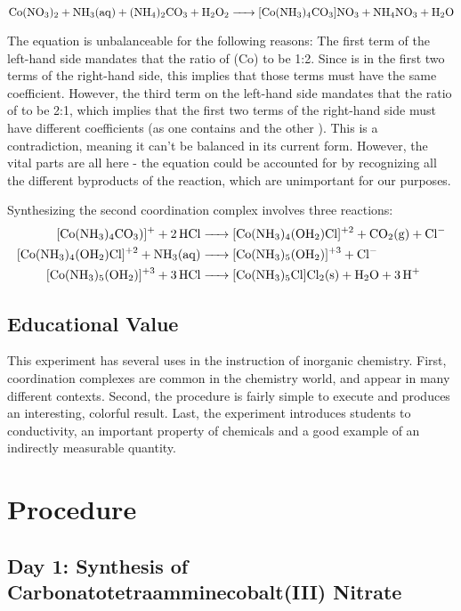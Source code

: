 \documentclass{article}
\begin{document}
\begin{equation}
\ce{Co(NO3)2 + NH3(aq) + (NH4)2CO3 + H2O2 -> [Co(NH3)4CO3]NO3 + NH4NO3 + H2O}
\end{equation}

The equation is unbalanceable for the following reasons: The first term of the left-hand side mandates that the ratio of \ce(Co) to  be 1:2. Since  is in the first two terms of the right-hand side, this implies that those terms must have the same coefficient. However, the third term on the left-hand side mandates that the ratio of  to  be 2:1, which implies that the first two terms of the right-hand side must have different coefficients (as one contains  and the other ). This is a contradiction, meaning it can't be balanced in its current form. However, the vital parts are all here - the equation could be accounted for by recognizing all the different byproducts of the reaction, which are unimportant for our purposes.

Synthesizing the second coordination complex involves three reactions:
\begin{equation}
\begin{aligned}
\ce{[Co(NH3)4CO3)]+ + 2HCl &-> [Co(NH3)4(OH2)Cl]^{+2} + CO2(g) + Cl-}\\
\ce{[Co(NH3)4(OH2)Cl]^{+2} + NH3(aq) &-> [Co(NH3)5(OH2)]^{+3} + Cl-}\\
\ce{[Co(NH3)5(OH2)]^{+3} + 3HCl &-> [Co(NH3)5Cl]Cl2(s) + H2O + 3H+}
\end{aligned}
\end{equation}

\subsection{Educational Value}
This experiment has several uses in the instruction of inorganic chemistry. First, coordination complexes are common in the chemistry world, and appear in many different contexts. Second, the procedure is fairly simple to execute and produces an interesting, colorful result. Last, the experiment introduces students to conductivity, an important property of chemicals and a good example of an indirectly measurable quantity.

\section{Procedure}

\subsection{Day 1: Synthesis of Carbonatotetraamminecobalt(III) Nitrate}
\end{document}
